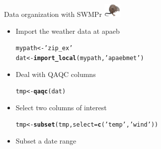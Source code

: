 \documentclass[xcolor=dvipsnames]{beamer}\usepackage[]{graphicx}\usepackage[]{color}
\makeatletter
\newcommand{\hlstr}[1]{\textcolor[rgb]{0.192,0.494,0.8}{#1}}%
\newcommand{\hlstd}[1]{\textcolor[rgb]{0.345,0.345,0.345}{#1}}%
\newcommand{\hlkwb}[1]{\textcolor[rgb]{0.69,0.353,0.396}{#1}}%
\newcommand{\hlkwc}[1]{\textcolor[rgb]{0.333,0.667,0.333}{#1}}%
\newcommand{\hlkwd}[1]{\textcolor[rgb]{0.737,0.353,0.396}{\textbf{#1}}}%
\newenvironment{kframe}{%
 \def\at@end@of@kframe{}%
 \ifinner\ifhmode%
  \def\at@end@of@kframe{\end{minipage}}%
  \begin{minipage}{\columnwidth}%
 \fi\fi%
 \def\FrameCommand##1{\hskip\@totalleftmargin \hskip-\fboxsep
 \colorbox{shadecolor}{##1}\hskip-\fboxsep
     \hskip-\linewidth \hskip-\@totalleftmargin \hskip\columnwidth}%
 \MakeFramed {\advance\hsize-\width
   \@totalleftmargin\z@ \linewidth\hsize
   \@setminipage}}%
 {\par\unskip\endMakeFramed%
 \at@end@of@kframe}
\newenvironment{knitrout}{}{} %
\makeatother
\begin{document}
\begin{frame}[fragile]{Data organization with SWMPr \includegraphics[width = 0.065\textwidth]{imgs/swmprat.png}}
\begin{itemize}
\item {}
Import the weather data at apaeb
\begin{knitrout}\scriptsize
{}\color{fgcolor}\begin{kframe}
\begin{alltt}
\hlstd{mypath} \hlkwb{<-} \hlstr{'zip_ex'}
\hlstd{dat} \hlkwb{<-} \hlkwd{import_local}\hlstd{(mypath,} \hlstr{'apaebmet'}\hlstd{)}
\end{alltt}
\end{kframe}
\end{knitrout}
\vspace{0.1in}
\item {}
Deal with QAQC columns
\begin{knitrout}\scriptsize
{}\color{fgcolor}\begin{kframe}
\begin{alltt}
\hlstd{tmp} \hlkwb{<-} \hlkwd{qaqc}\hlstd{(dat)}
\end{alltt}
\end{kframe}
\end{knitrout}
\vspace{0.1in}
\item {}
Select two columns of interest
\begin{knitrout}\scriptsize
{}\color{fgcolor}\begin{kframe}
\begin{alltt}
\hlstd{tmp} \hlkwb{<-} \hlkwd{subset}\hlstd{(tmp,} \hlkwc{select} \hlstd{=} \hlkwd{c}\hlstd{(}\hlstr{'temp'}\hlstd{,} \hlstr{'wind'}\hlstd{))}
\end{alltt}
\end{kframe}
\end{knitrout}
\vspace{0.1in}
\item {}
Subset a date range
\begin{knitrout}\scriptsize
{}\color{fgcolor}\begin{kframe}

\end{kframe}
\end{knitrout}
\end{itemize}
\end{frame}
\end{document}
